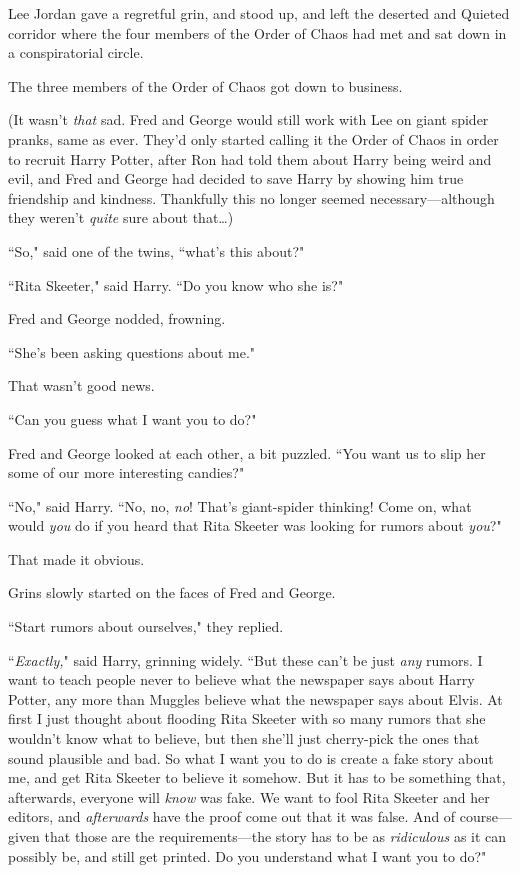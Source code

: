Lee Jordan gave a regretful grin, and stood up, and left the deserted and Quieted corridor where the four members of the Order of Chaos had met and sat down in a conspiratorial circle.

The three members of the Order of Chaos got down to business.

(It wasn't \emph{that} sad. Fred and George would still work with Lee on giant spider pranks, same as ever. They'd only started calling it the Order of Chaos in order to recruit Harry Potter, after Ron had told them about Harry being weird and evil, and Fred and George had decided to save Harry by showing him true friendship and kindness. Thankfully this no longer seemed necessary—although they weren't \emph{quite} sure about that{\ldots})

``So," said one of the twins, ``what's this about?"

``Rita Skeeter," said Harry. ``Do you know who she is?"

Fred and George nodded, frowning.

``She's been asking questions about me."

That wasn't good news.

``Can you guess what I want you to do?"

Fred and George looked at each other, a bit puzzled. ``You want us to slip her some of our more interesting candies?"

``No," said Harry. ``No, no, \emph{no}! That's giant-spider thinking! Come on, what would \emph{you} do if you heard that Rita Skeeter was looking for rumors about \emph{you}?"

That made it obvious.

Grins slowly started on the faces of Fred and George.

``Start rumors about ourselves," they replied.

``\emph{Exactly,}" said Harry, grinning widely. ``But these can't be just \emph{any} rumors. I want to teach people never to believe what the newspaper says about Harry Potter, any more than Muggles believe what the newspaper says about Elvis. At first I just thought about flooding Rita Skeeter with so many rumors that she wouldn't know what to believe, but then she'll just cherry-pick the ones that sound plausible and bad. So what I want you to do is create a fake story about me, and get Rita Skeeter to believe it somehow. But it has to be something that, afterwards, everyone will \emph{know} was fake. We want to fool Rita Skeeter and her editors, and \emph{afterwards} have the proof come out that it was false. And of course—given that those are the requirements—the story has to be as \emph{ridiculous} as it can possibly be, and still get printed. Do you understand what I want you to do?"

